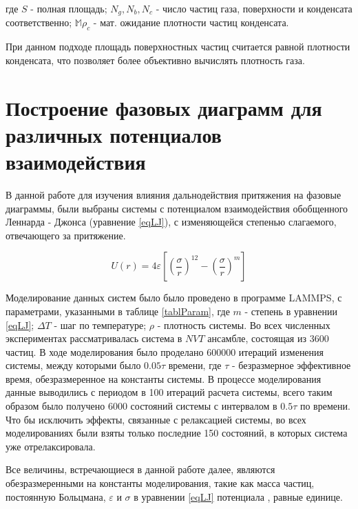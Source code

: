 где $S$ - полная площадь; $N_g, N_b, N_c$ - число частиц газа, поверхности и конденсата соответственно; $\mathbb{M}\rho_c$ - мат. ожидание плотности частиц конденсата.

При данном подходе площадь поверхностных частиц считается равной плотности конденсата, что позволяет более объективно вычислять плотность газа.


\section{Построение фазовых диаграмм для различных потенциалов взаимодействия}\label{C2_2}

В данной работе для изучения влияния дальнодействия притяжения на фазовые диаграммы, были выбраны системы с потенциалом взаимодействия обобщенного Леннарда - Джонса (уравнение \ref{eqLJ}), с изменяющейся степенью слагаемого, отвечающего за притяжение.

\begin{equation}
U(r) = 4\varepsilon \left[ \left(\frac{\sigma}{r}\right)^{12} - \left(\frac{\sigma}{r}\right)^{m} \right]
\label{eqLJ}
\end{equation}

Моделирование данных систем было было проведено в программе LAMMPS, с параметрами, указанными в таблице \ref{tablParam}, где $m$ - степень в уравнении \ref{eqLJ}; $\Delta T$ - шаг по температуре;  $\rho$ - плотность системы. Во всех численных экспериментах рассматривалась система в $NVT$ ансамбле, состоящая из 3600 частиц. В ходе моделирования было проделано 600000 итераций изменения системы, между которыми было $0.05\tau$ времени, где $\tau$ - безразмерное эффективное время, обезразмеренное на константы системы. В процессе моделирования данные выводились с периодом в 100 итераций расчета системы, всего таким образом было получено 6000 состояний системы с интервалом в $0.5\tau$ по времени. Что бы исключить эффекты, связанные с релаксацией системы, во всех моделированиях были взяты только последние 150 состояний, в которых система уже отрелаксировала.   

Все величины, встречающиеся в данной работе далее, являются обезразмеренными на константы моделирования, такие как масса частиц, постоянную Больцмана, $\varepsilon$ и $\sigma$ в уравнении \ref{eqLJ} потенциала , равные единице.


